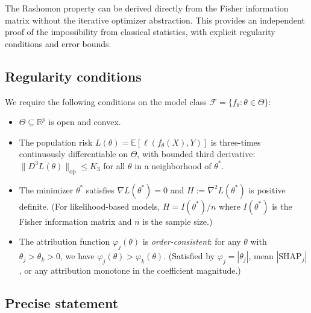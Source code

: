 \documentclass{article}
\begin{document}
The Rashomon property can be derived directly from the Fisher information
matrix without the iterative optimizer abstraction. This provides an
independent proof of the impossibility from classical statistics, with
explicit regularity conditions and error bounds.

\subsection{Regularity conditions}

We require the following conditions on the model class $\mathcal{F} = \{f_\theta : \theta \in \Theta\}$:
\begin{itemize}
    \item[\textbf{(R1)}] $\Theta \subseteq \mathbb{R}^p$ is open and convex.
    \item[\textbf{(R2)}] The population risk $L(\theta) = \mathbb{E}[\ell(f_\theta(X), Y)]$ is three-times continuously differentiable on $\Theta$, with bounded third derivative: $\|D^3 L(\theta)\|_{\text{op}} \leq K_3$ for all $\theta$ in a neighborhood of $\theta^*$.
    \item[\textbf{(R3)}] The minimizer $\theta^*$ satisfies $\nabla L(\theta^*) = 0$ and $H := \nabla^2 L(\theta^*)$ is positive definite. (For likelihood-based models, $H = I(\theta^*)/n$ where $I(\theta^*)$ is the Fisher information matrix and $n$ is the sample size.)
    \item[\textbf{(R4)}] The attribution function $\varphi_j(\theta)$ is \emph{order-consistent}: for any $\theta$ with $\theta_j > \theta_k > 0$, we have $\varphi_j(\theta) > \varphi_k(\theta)$. (Satisfied by $\varphi_j = |\theta_j|$, mean $|\text{SHAP}_j|$, or any attribution monotone in the coefficient magnitude.)
\end{itemize}

\subsection{Precise statement}
\end{document}

